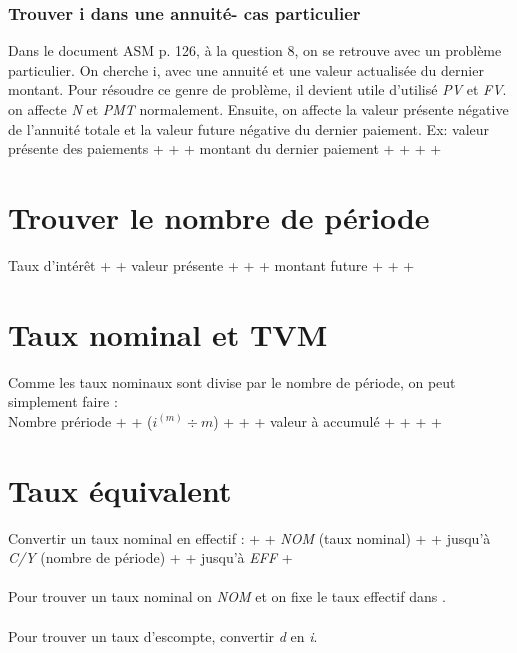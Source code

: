 \documentclass[11pt,french]{report}
\begin{document}
\subsubsection{Trouver i dans une annuité- cas particulier}
Dans le document ASM p. 126, à la question 8, on se retrouve avec un problème particulier. On cherche i, avec une annuité et une valeur actualisée du dernier montant. Pour résoudre ce genre de problème, il devient utile d'utilisé \textit{PV} et \textit{FV}. on affecte \textit{N} et \textit{PMT} normalement. Ensuite, on affecte la valeur présente négative de l'annuité totale et la valeur future négative du dernier paiement. 
Ex: valeur présente des paiements + \fbox{+|-} +  + montant du dernier paiement + \fbox{+|-} +  +  + 

\section{Trouver le nombre de période}
\label{sec:isoler t}

Taux d'intérêt +  + valeur présente + \fbox{+|- } +  + montant future +  +  + 

\section{Taux nominal et TVM}
\label{sec:taux nominal dans TVM}

Comme les taux nominaux sont divise par le nombre de période, on peut simplement faire : \\
Nombre prériode +  + ($i^{(m)} \div m$) + \fbox{=} +  + valeur à accumulé + \fbox{+|-} +  +  + 
\pagebreak

\section{Taux équivalent}
\label{sec:nominal to effectif}

Convertir un taux nominal en effectif :  +  + \emph{NOM} (taux nominal) +  + \fbox{$\Downarrow$} jusqu'à \emph{C/Y} (nombre de période) +  + \fbox{$\Uparrow$} jusqu'à \emph{EFF} + 
\\
\\ Pour trouver un taux nominal on  \emph{NOM} et on fixe le taux effectif dans .
\\
\\ Pour trouver un taux d'escompte, convertir \emph{d} en \emph{i}.
\end{document}
